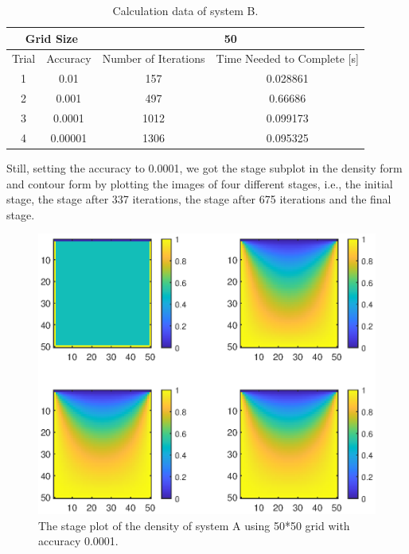 \documentclass[12pt]{report}
\begin{document}
\begin{table}[H]
    \centering
    \begin{tabular}{|c|c|c|c|}
        \hline
        \multicolumn{2}{|c|}{Grid Size}&\multicolumn{2}{c|}{50}\\
        \hline
         Trial&Accuracy&Number of Iterations&Time Needed to Complete [s]\\
         \hline
        1 & 0.01 & 157 & 0.028861 \\
        \hline
        2 &0.001& 497 &  0.66686  \\
        \hline
        3 & 0.0001 &  1012 &  0.099173 \\
        \hline
        4 & 0.00001 & 1306 & 0.095325 \\
        \hline
    \end{tabular}
    \caption{Calculation data of system B.}
\end{table}
Still, setting the accuracy to 0.0001, we got the stage subplot in the density form and contour form by plotting the images of four different stages, i.e., the initial stage, the stage after 337 iterations, the stage after 675 iterations and the final stage.
\begin{figure}[H]
    \centering
    \includegraphics[width=0.8\linewidth]{BStageDensity.eps}
    \caption{The stage plot of the density of system A using 50*50 grid with accuracy 0.0001.}
\end{figure}
\end{document}

